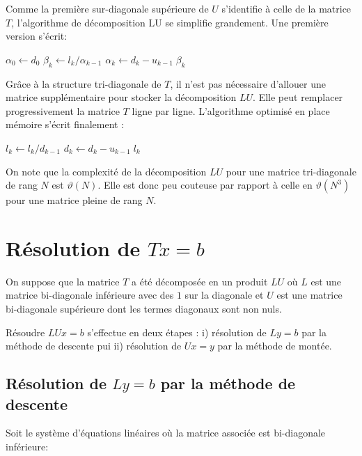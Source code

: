 \documentclass{article}
\begin{document}
Comme la première sur-diagonale supérieure de $U$ s'identifie à celle de la matrice $T$,
 l'algorithme de décomposition LU se simplifie grandement.
 Une première version s'écrit:\\

\begin{algorithmic}[1]
\State $\alpha_0 \gets d_0$
	\State $\beta_k \gets l_k/\alpha_{k-1}$
	\State $\alpha_k \gets d_k -u_{k-1} \; \beta_k$
\EndFor                 
\EndFunction
\end{algorithmic}

Grâce à la structure tri-diagonale de $T$, il n'est pas nécessaire d'allouer une matrice supplémentaire
pour stocker la décomposition $LU$. Elle peut remplacer progressivement la matrice $T$ ligne par ligne.
L'algorithme optimisé en place mémoire s'écrit finalement : \\

\begin{algorithmic}[1]
 
	\State $l_k \gets l_k/d_{k-1}$
	\State $d_k \gets d_k -u_{k-1} \; l_k$
\EndFor                 
\EndFunction
\end{algorithmic}

On note que la complexité de la décomposition $LU$ pour une matrice tri-diagonale de rang $N$ est $\vartheta(N)$.
Elle est donc peu couteuse par rapport à celle en $\vartheta(N^3)$ pour une matrice pleine de rang $N$.

\section{Résolution de $T x=b$}

On suppose que la matrice $T$ a été décomposée en un produit $LU$ où $L$ est une matrice bi-diagonale inférieure
avec des $1$ sur la diagonale et $U$ est une matrice bi-diagonale supérieure dont les termes diagonaux sont non nuls.

Résoudre $LU x=b$ s'effectue en deux étapes : i) résolution de $L y=b$ par la méthode de descente pui ii) résolution
de $U x=y$ par la méthode de montée.

\subsection{Résolution de $ L y=b$ par la méthode de descente}

Soit le système d'équations linéaires où la matrice associée est bi-diagonale inférieure:
\end{document}

